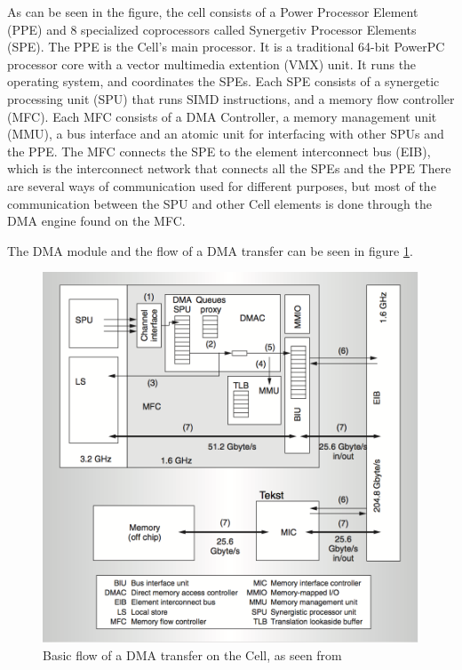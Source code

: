 As can be seen in the figure, the cell consists of a Power Processor Element (PPE) and 8 specialized coprocessors called Synergetiv Processor Elements (SPE).
The PPE is the Cell's main processor.
It is a traditional 64-bit PowerPC processor core with a vector multimedia extention (VMX) unit.
It runs the operating system, and coordinates the SPEs.
Each SPE consists of a synergetic processing unit (SPU) that runs SIMD instructions, and a memory flow controller (MFC).
Each MFC consists of a DMA Controller, a memory management unit (MMU), a bus interface and an atomic unit for interfacing with other SPUs and the PPE.
The MFC connects the SPE to the element interconnect bus (EIB), which is the interconnect network that connects all the SPEs and the PPE
There are several ways of communication used for different purposes, but most of the communication between the SPU and other Cell elements is done through the DMA engine found on the MFC.

The DMA module and the flow of a DMA transfer can be seen in figure \ref{fig:CellDMA}.
\begin{figure}[h!]
    \centering
    \includegraphics[width=1\textwidth]{Figures/DMA/CellDMA}
    \caption{Basic flow of a DMA transfer on the Cell, as seen from \cite{cell}}
    \label{fig:CellDMA}
\end{figure}

